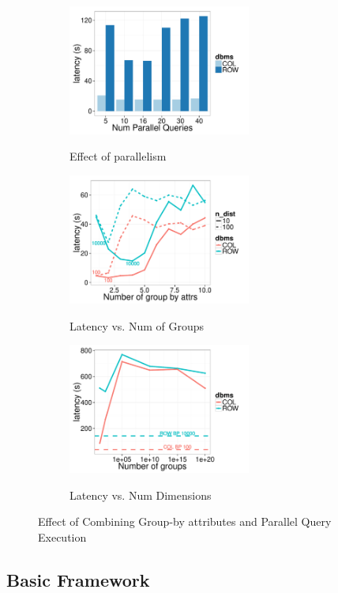 \begin{figure}[t]
	\centering
	\begin{subfigure}{0.33\linewidth}
		\centering
		{\includegraphics[width=6cm] {Images/parallel_noop.pdf}}
		\caption{Effect of parallelism}
		\label{fig:parallelism}
	\end{subfigure}
	\begin{subfigure}{0.33\linewidth}
		\centering
		{\includegraphics[width=6cm] {Images/multi_gb_same.pdf}}
		\caption{Latency vs. Num of Groups}
		\label{fig:multi_gb_same}
	\end{subfigure}
	\begin{subfigure}{0.33\linewidth}
		\centering
		{\includegraphics[width=6cm] {Images/multi_gb.pdf}}
		\caption{Latency vs. Num Dimensions}
		\label{fig:multi_gb_bp}
	\end{subfigure}
	\vspace{-10pt}
	\caption{Effect of Combining Group-by attributes and Parallel Query Execution}
	\label{fig:bank_perf}
	\vspace{-10pt}
\end{figure}

\subsection{Basic \large{\SeeDB} Framework}
\label{sec:basic_framework_expts}

